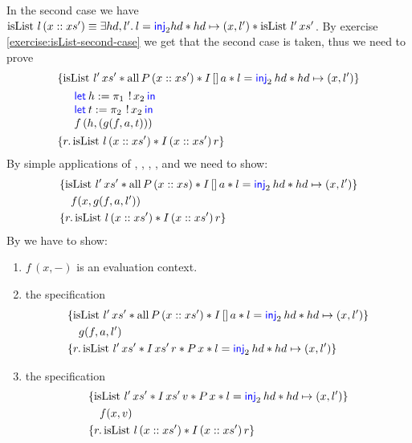 In the second case we have $\operatorname{isList}\, l\, (x :: xs') \equiv \Exists hd, l'.l = \langkw{inj}_2 hd \ast hd \pointsto (x, l') \ast \operatorname{isList}\, l'\, xs'$. By exercise \ref{exercise:isList-second-case} we get that the second case is taken, thus we need to prove
\begin{align*}
  \hoareV{ 
  	\operatorname{isList} \, l' \, xs' \ast \operatorname{all} P \, (x::xs') \ast I \, [] \, a \ast l = \Inj2 hd \ast hd \pointsto (x,l') }
  {\begin{array}{l}
     \Let h= \Proj{1} \deref x_2 in\\
     \Let t = \Proj{2} \deref x_2 in\\
    	f\, (h, (g(f, a, t)))
   \end{array}}
  {r.  \operatorname{isList} \, l \, (x::xs') \ast I \, (x::xs') \, r}
\end{align*}
By simple applications of , , , ,  and  we need to show:
\begin{align*}
  \hoareV{ \operatorname{isList} \, l' \, xs' \ast \operatorname{all} P \, (x::xs) \ast I \, [] \, a \ast l = \Inj2 hd \ast hd \pointsto (x,l')  }
    	{f (x, g(f, a, l'))}
  {r. \operatorname{isList} \, l \, (x::xs') \ast I \, (x::xs') \, r}
\end{align*}
By  we have to show:
\begin{enumerate}
\item $f\, (x , -)$ is an evaluation context.
\item the specification
  \begin{align*}
\hoareV{ \operatorname{isList} \, l' \, xs' \ast \operatorname{all} P \, (x::xs') \ast I \, [] \, a \ast l = \Inj2 hd \ast hd \pointsto (x,l')  }
    	{g(f, a, l')}
  {r. \operatorname{isList} \, l' \, xs' \ast I \, xs' \, r \ast P\, x \ast l = \Inj2 hd \ast hd \pointsto (x,l') }
\end{align*}
\item the specification \begin{align*}
  \hoareV{ \operatorname{isList} \, l' \, xs' \ast I \, xs' \, v \ast P\, x \ast l = \Inj2 hd \ast hd \pointsto (x,l') }
    	{f (x, v)}
  {r. \operatorname{isList} \, l \, (x::xs') \ast I \, (x::xs') \, r}
\end{align*}
\end{enumerate}

